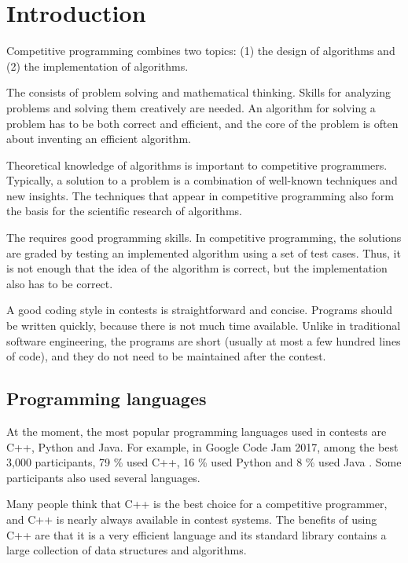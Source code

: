 \chapter{Introduction}

Competitive programming combines two topics:
(1) the design of algorithms and (2) the implementation of algorithms.

The  consists of problem solving
and mathematical thinking.
Skills for analyzing problems and solving them
creatively are needed.
An algorithm for solving a problem
has to be both correct and efficient,
and the core of the problem is often
about inventing an efficient algorithm.

Theoretical knowledge of algorithms
is important to competitive programmers.
Typically, a solution to a problem is
a combination of well-known techniques and
new insights.
The techniques that appear in competitive programming
also form the basis for the scientific research
of algorithms.

The  requires good
programming skills.
In competitive programming, the solutions
are graded by testing an implemented algorithm
using a set of test cases.
Thus, it is not enough that the idea of the
algorithm is correct, but the implementation also
has to be correct.

A good coding style in contests is
straightforward and concise.
Programs should be written quickly,
because there is not much time available.
Unlike in traditional software engineering,
the programs are short (usually at most a few
hundred lines of code), and they do not need to 
be maintained after the contest.

\section{Programming languages}


At the moment, the most popular programming
languages used in contests are C++, Python and Java.
For example, in Google Code Jam 2017,
among the best 3,000 participants,
79 \% used C++,
16 \% used Python and
8 \% used Java \cite{goo17}.
Some participants also used several languages.

Many people think that C++ is the best choice
for a competitive programmer,
and C++ is nearly always available in
contest systems.
The benefits of using C++ are that
it is a very efficient language and
its standard library contains a 
large collection
of data structures and algorithms.

